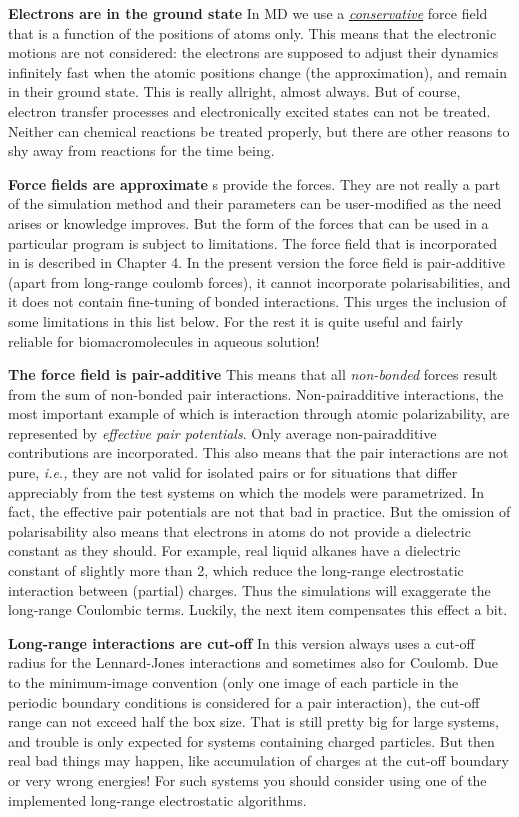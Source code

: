 {\bf Electrons are in the ground state}    
In MD we use a {\em \underline {conservative}} force field that is a
function of the positions of atoms only.  This means that the
electronic motions are not considered: the electrons are supposed to
adjust their dynamics infinitely fast when the atomic positions change
(the {\em {}} approximation), and remain in
their ground state. This is really allright, almost always. But of
course, electron transfer processes and electronically excited states
can not be treated. Neither can chemical reactions be treated
properly, but there are other reasons to shy away from reactions for
the time being.

{\bf Force fields are approximate}
s provide the forces. They are not really a part of the
simulation method and their parameters can be user-modified as the
need arises or knowledge improves. But the form of the forces that can
be used in a particular program is subject to limitations. The force
field that is incorporated in {\gromacs} is described in Chapter 4. In
the present version the force field is pair-additive (apart from
long-range coulomb forces), it cannot incorporate
polarisabilities, and it does not contain fine-tuning of bonded
interactions. This urges the inclusion of some limitations in this
list below.  For the rest it is quite useful and fairly reliable for
biomacromolecules in aqueous solution!

{\bf The force field is pair-additive} 
This means that all {\em non-bonded} forces result from the sum of
non-bonded pair interactions. Non-pairadditive interactions, the most
important example of which is interaction through atomic
polarizability, are represented by {\em effective pair
potentials}. Only average non-pairadditive contributions are
incorporated. This also means that the pair interactions are not pure,
{\em i.e.,} they are not valid for isolated pairs or for situations
that differ appreciably from the test systems on which the models were
parametrized. In fact, the effective pair potentials are not that bad
in practice. But the omission of polarisability also means that
electrons in atoms do not provide a dielectric constant as they
should. For example, real liquid alkanes have a dielectric constant of
slightly more than 2, which reduce the long-range electrostatic
interaction between (partial) charges. Thus the simulations will
exaggerate the long-range Coulombic terms. Luckily, the next item
compensates this effect a bit.

{\bf Long-range interactions are cut-off}
In this version {\gromacs} always uses a cut-off radius for the
Lennard-Jones interactions and sometimes also for Coulomb. 
Due to the minimum-image convention (only one image of
each particle in the periodic boundary conditions is considered for a
pair interaction), the cut-off range can not exceed half the box
size. That is still pretty big for large systems, and trouble is only
expected for systems containing charged particles. But then real bad
things may happen, like accumulation of charges at the cut-off
boundary or very wrong energies! For such systems you should consider
using one of the implemented long-range electrostatic algorithms.

